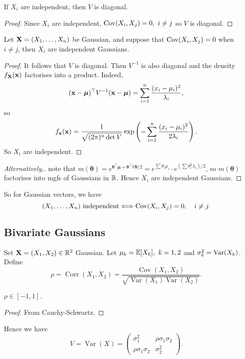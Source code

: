 \begin{lemma}
    If $X_i$ are independent, then $V$ is diagonal.
\end{lemma}
\begin{proof}
    Since $X_i$ are independent, $ \operatorname{Cov}(X_i,X_j)=0,\ i\neq j $ so $ V $ is diagonal.
\end{proof}
\begin{proposition}
    Let ${\bf X}=(X_1,\ldots,X_n)$ be Gaussian, and suppose that $\operatorname{Cov}(X_i,X_j)=0$ when $i\neq j$, then $X_i$ are independent Gaussians.
\end{proposition}
\begin{proof}
    It follows that $V$ is diagonal. Then $V^{-1}$ is also diagonal and the density $ f_{{\bf X}}({\bf x}) $ factorises into a product. Indeed,
    \[
        ({\bf x}-\boldsymbol{\mu})^\top V^{-1} ({\bf x}-\boldsymbol{\mu}) = \sum_{i=1}^{n}\frac{(x_i-\mu_i)^2}{\lambda_i},
    \]
    so 
    \[
        f_{{\bf x}}({\bf x}) = \frac{1}{\sqrt{(2\pi)^n\det V}} \exp \left( - \sum_{i=1}^{n}\frac{(x_i-\mu_i)^2}{2\lambda_i}\right).
    \]
    So $X_i$ are independent.
\end{proof}
\begin{proof}[Alternatively,]
    note that $ m(\boldsymbol{\theta})=e^{\boldsymbol{\theta}^\top \boldsymbol{\mu}+ \boldsymbol{\theta}^\top V \boldsymbol{\theta}/2} = e^{\sum \theta_i \mu_i} \cdot e^{(\sum \theta_i^2 \lambda_i)/2} $, so $ m(\boldsymbol{\theta}) $ factorises into mgfs of Gaussians in ${\mathbb{R}}$. Hence $ X_i $ are independent Gaussians.
\end{proof}

So for Gaussian vectors, we have 
\[
    (X_1,\dots,X_n) \text{ independent} \Longleftrightarrow \operatorname{Cov}(X_i,X_j)=0,\quad i\neq j.
\]

\subsection{Bivariate Gaussians}
Set $ {\bf X}=(X_1,X_2)\in \mathbb{R}^{2} $ Gaussian. Let $ \mu_k={\mathbb{E}}[X_k],\ k=1,2 $ and $ \sigma_k^2 = \operatorname{Var}(X_k) $. Define
$$\rho=\operatorname{Corr}(X_1,X_2)=\frac{\operatorname{Cov}(X_1,X_2)}{\sqrt{\operatorname{Var}(X_1)\operatorname{Var}(X_2)}}.$$

\begin{claim}
    $ \rho\in [-1,1] $.
\end{claim}
\begin{proof}
    From Cauchy-Schwartz.
\end{proof}

Hence we have
$$V=\operatorname{Var}(X)=\begin{pmatrix}
    \sigma_1^2&\rho\sigma_1\sigma_2\\
    \rho\sigma_1\sigma_2&\sigma_2^2
\end{pmatrix}.$$


